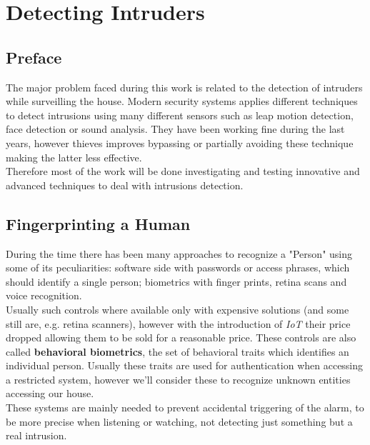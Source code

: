 \chapter{Detecting Intruders}


\section{Preface}
The major problem faced during this work is related
to the detection of intruders while surveilling the house.
Modern security systems applies different techniques to detect intrusions
using many different sensors such as leap motion detection, face detection
or sound analysis. They have been working fine during the last years, however
thieves improves bypassing or partially avoiding these technique making the latter
less effective.\\
Therefore most of the work will be done investigating and testing innovative and
advanced techniques to deal with intrusions detection.

\section{Fingerprinting a Human}

During the time there has been many approaches to recognize a "Person"
using some of its peculiarities: software side with passwords or access phrases,
which should identify a single person; biometrics with finger prints, retina scans
and voice recognition.\\
Usually such controls where available only with expensive solutions (and some still are, e.g. retina
scanners), however with the introduction of \textit{IoT} their price dropped allowing
them to be sold for a reasonable price. These controls are also called \textbf{behavioral biometrics},
the set of behavioral traits which identifies an individual person. Usually these traits are
used for authentication when accessing a restricted system, however we'll consider
these to recognize unknown entities accessing our house. \\
These systems are mainly needed to prevent accidental triggering of the alarm, to be more
precise when listening or watching, not detecting just something but a real intrusion.

